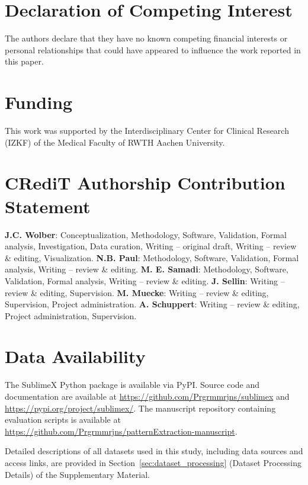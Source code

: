 \documentclass[times, review, 10pt]{elsarticle}
\begin{document}
\section*{Declaration of Competing Interest}

The authors declare that they have no known competing financial interests or personal relationships that could have appeared to influence the work reported in this paper.

\section*{Funding}
This work was supported by the Interdisciplinary Center for Clinical Research (IZKF) of the Medical Faculty of RWTH Aachen University.

\section*{CRediT Authorship Contribution Statement}

\textbf{J.C. Wolber}: Conceptualization, Methodology, Software, Validation,
Formal analysis, Investigation, Data curation, Writing -- original draft,
Writing -- review \& editing, Visualization.
\textbf{N.B. Paul}: Methodology, Software, Validation, Formal analysis,
Writing -- review \& editing.
\textbf{M. E. Samadi}: Methodology, Software, Validation, Formal analysis,
Writing -- review \& editing.
\textbf{J. Sellin}: Writing -- review \& editing, Supervision.
\textbf{M. Muecke}: Writing -- review \& editing, Supervision, Project
administration.
\textbf{A. Schuppert}: Writing -- review \& editing, Project administration, Supervision.
\section*{Data Availability}

The SublimeX Python package is available via PyPI.
Source code and documentation are available at \url{https://github.com/Prgrmmrjns/sublimex} and \url{https://pypi.org/project/sublimex/}.
The manuscript repository containing evaluation scripts is available at \url{https://github.com/Prgrmmrjns/patternExtraction-manuscript}.

Detailed descriptions of all datasets used in this study, including data sources and access links, are provided in Section~\ref{sec:dataset_processing} (Dataset Processing Details) of the Supplementary Material.



\end{document}
